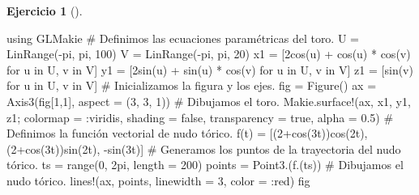 \documentclass[
  a4paper,
]{scrreport}
\newenvironment{Shaded}{\begin{snugshade}}{\end{snugshade}}
\newcommand{\BuiltInTok}[1]{\textcolor[rgb]{0.00,0.23,0.31}{#1}}
\newcommand{\CommentTok}[1]{\textcolor[rgb]{0.37,0.37,0.37}{#1}}
\newcommand{\ConstantTok}[1]{\textcolor[rgb]{0.56,0.35,0.01}{#1}}
\newcommand{\FloatTok}[1]{\textcolor[rgb]{0.68,0.00,0.00}{#1}}
\newcommand{\FunctionTok}[1]{\textcolor[rgb]{0.28,0.35,0.67}{#1}}
\newcommand{\ImportTok}[1]{\textcolor[rgb]{0.00,0.46,0.62}{#1}}
\newcommand{\KeywordTok}[1]{\textcolor[rgb]{0.00,0.23,0.31}{#1}}
\newcommand{\NormalTok}[1]{\textcolor[rgb]{0.00,0.23,0.31}{#1}}
\newcommand{\OperatorTok}[1]{\textcolor[rgb]{0.37,0.37,0.37}{#1}}
\theoremstyle{definition}
\newtheorem{exercise}{Ejercicio}[chapter]
\theoremstyle{remark}
\begin{document}
\begin{exercise}[]
\begin{enumerate}
\begin{tcolorbox}
\begin{Shaded}
\begin{Highlighting}[]
\ImportTok{using} \BuiltInTok{GLMakie}
\CommentTok{\# Definimos las ecuaciones paramétricas del toro.}
\NormalTok{U }\OperatorTok{=} \FunctionTok{LinRange}\NormalTok{(}\OperatorTok{{-}}\ConstantTok{pi}\NormalTok{, }\ConstantTok{pi}\NormalTok{, }\FloatTok{100}\NormalTok{)}
\NormalTok{V }\OperatorTok{=} \FunctionTok{LinRange}\NormalTok{(}\OperatorTok{{-}}\ConstantTok{pi}\NormalTok{, }\ConstantTok{pi}\NormalTok{, }\FloatTok{20}\NormalTok{)}
\NormalTok{x1 }\OperatorTok{=}\NormalTok{ [}\FloatTok{2}\FunctionTok{cos}\NormalTok{(u) }\OperatorTok{+} \FunctionTok{cos}\NormalTok{(u) }\OperatorTok{*} \FunctionTok{cos}\NormalTok{(v) for u }\KeywordTok{in}\NormalTok{ U, v }\KeywordTok{in}\NormalTok{ V]}
\NormalTok{y1 }\OperatorTok{=}\NormalTok{ [}\FloatTok{2}\FunctionTok{sin}\NormalTok{(u) }\OperatorTok{+} \FunctionTok{sin}\NormalTok{(u) }\OperatorTok{*} \FunctionTok{cos}\NormalTok{(v) for u }\KeywordTok{in}\NormalTok{ U, v }\KeywordTok{in}\NormalTok{ V]}
\NormalTok{z1 }\OperatorTok{=}\NormalTok{ [}\FunctionTok{sin}\NormalTok{(v) for u }\KeywordTok{in}\NormalTok{ U, v }\KeywordTok{in}\NormalTok{ V]}
\CommentTok{\# Inicializamos la figura y los ejes.}
\NormalTok{fig }\OperatorTok{=} \FunctionTok{Figure}\NormalTok{()}
\NormalTok{ax }\OperatorTok{=} \FunctionTok{Axis3}\NormalTok{(fig[}\FloatTok{1}\NormalTok{,}\FloatTok{1}\NormalTok{], aspect }\OperatorTok{=}\NormalTok{ (}\FloatTok{3}\NormalTok{, }\FloatTok{3}\NormalTok{, }\FloatTok{1}\NormalTok{))}
\CommentTok{\# Dibujamos el toro.}
\NormalTok{Makie.}\FunctionTok{surface!}\NormalTok{(ax, x1, y1, z1; colormap }\OperatorTok{=} \OperatorTok{:}\NormalTok{viridis, shading }\OperatorTok{=} \ConstantTok{false}\NormalTok{, transparency }\OperatorTok{=} \ConstantTok{true}\NormalTok{, alpha }\OperatorTok{=} \FloatTok{0.5}\NormalTok{)}
\CommentTok{\# Definimos la función vectorial de nudo tórico.}
\FunctionTok{f}\NormalTok{(t) }\OperatorTok{=}\NormalTok{ [(}\FloatTok{2}\FunctionTok{+cos}\NormalTok{(}\FloatTok{3}\NormalTok{t))}\FunctionTok{cos}\NormalTok{(}\FloatTok{2}\NormalTok{t), (}\FloatTok{2}\FunctionTok{+cos}\NormalTok{(}\FloatTok{3}\NormalTok{t))}\FunctionTok{sin}\NormalTok{(}\FloatTok{2}\NormalTok{t), }\FunctionTok{{-}sin}\NormalTok{(}\FloatTok{3}\NormalTok{t)] }
\CommentTok{\# Generamos los puntos de la trayectoria del nudo tórico.}
\NormalTok{ts }\OperatorTok{=} \FunctionTok{range}\NormalTok{(}\FloatTok{0}\NormalTok{, }\FloatTok{2}\NormalTok{pi, length }\OperatorTok{=} \FloatTok{200}\NormalTok{)}
\NormalTok{points }\OperatorTok{=} \FunctionTok{Point3}\NormalTok{.(}\FunctionTok{f}\NormalTok{.(ts))}
\CommentTok{\# Dibujamos el nudo tórico.}
\FunctionTok{lines!}\NormalTok{(ax, points, linewidth }\OperatorTok{=} \FloatTok{3}\NormalTok{, color }\OperatorTok{=} \OperatorTok{:}\NormalTok{red)}
\NormalTok{fig}
\end{Highlighting}
\end{Shaded}


\end{tcolorbox}
\end{enumerate}
\end{exercise}
\end{document}

